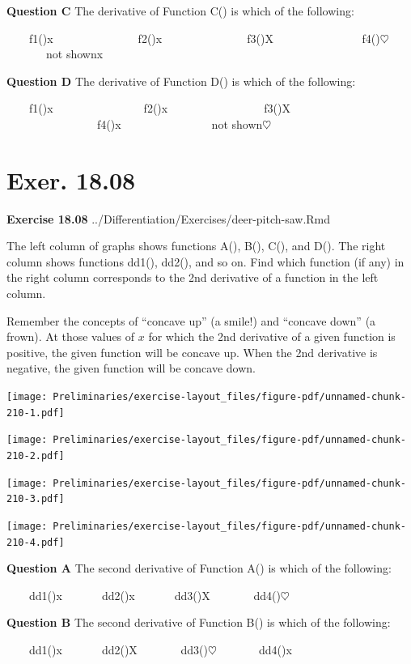 \documentclass[
  letterpaper,
  DIV=11,
  numbers=noendperiod,
  oneside]{article}
\begin{document}
\begin{multicols}{2}
\textbf{Question C} The derivative of Function C() is which of the
following:

~~~~{f1(){x~~~~~~~~}}~~~~~~~{f2(){x~~~~~~~~}}~~~~~~~{f3(){︎X
~~~~~~~~}}~~~~~~~{f4(){\(\heartsuit\ \)}}~~~~~~~{not shown{x}}

\textbf{Question D} The derivative of Function D() is which of the
following:

~~~~{f1(){x~~~~~~~~~}}~~~~~~~{f2(){x~~~~~~~~~~}}~~~~~~~{f3(){︎X
~~~~~~~~~}}~~~~~~~{f4(){x~~~~~~~~~}}~~~~~~~{not
shown{\(\heartsuit\ \)}}

\hypertarget{exer.-18.08}{%
\section*{Exer. 18.08}\label{exer.-18.08}}

\textbf{Exercise 18.08} ../Differentiation/Exercises/deer-pitch-saw.Rmd

The left column of graphs shows functions A(), B(), C(), and D(). The
right column shows functions dd1(), dd2(), and so on. Find which
function (if any) in the right column corresponds to the 2nd derivative
of a function in the left column.

Remember the concepts of ``concave up'' (a smile!) and ``concave down''
(a frown). At those values of \(x\) for which the 2nd derivative of a
given function is positive, the given function will be concave up. When
the 2nd derivative is negative, the given function will be concave down.

\texttt{[image: Preliminaries/exercise-layout\_files/figure-pdf/unnamed-chunk-210-1.pdf]}

\texttt{[image: Preliminaries/exercise-layout\_files/figure-pdf/unnamed-chunk-210-2.pdf]}

\texttt{[image: Preliminaries/exercise-layout\_files/figure-pdf/unnamed-chunk-210-3.pdf]}

\texttt{[image: Preliminaries/exercise-layout\_files/figure-pdf/unnamed-chunk-210-4.pdf]}

\textbf{Question A} The second derivative of Function A() is which of
the following:

~~~~{dd1(){x}}~~~~~~~{dd2(){x}}~~~~~~~{dd3(){︎X
}}~~~~~~~{dd4(){\(\heartsuit\ \)}}

\textbf{Question B} The second derivative of Function B() is which of
the following:

~~~~{dd1(){x}}~~~~~~~{dd2(){︎X
}}~~~~~~~{dd3(){\(\heartsuit\ \)}}~~~~~~~{dd4(){x}}


\end{multicols}
\end{document}
